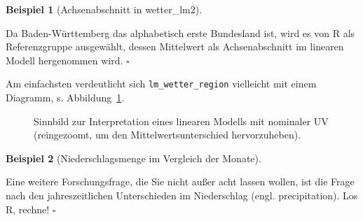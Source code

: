 \documentclass[
  letterpaper,
  twoside,
  open=any]{scrbook}
\theoremstyle{definition}
\theoremstyle{definition}
\newtheorem{example}{Beispiel}[chapter]
\theoremstyle{definition}
\theoremstyle{remark}
\begin{document}
\begin{example}[Achsenabschnitt in
wetter\_lm2]\protect\hypertarget{exm-bawü}{}\label{exm-bawü}

Da Baden-Württemberg das alphabetisch erste Bundesland ist, wird es von
R als Referenzgruppe ausgewählt, dessen Mittelwert als Achsenabschnitt
im linearen Modell hergenommen wird. \(\square\)

\end{example}

Am einfachsten verdeutlicht sich \texttt{lm\_wetter\_region} vielleicht
mit einem Diagramm, s. Abbildung~\ref{fig-bin-nom}.

\begin{figure}


\caption{\label{fig-bin-nom}Sinnbild zur Interpretation eines linearen
Modells mit nominaler UV (reingezoomt, um den Mittelwertsunterschied
hervorzuheben).}

\end{figure}%

\begin{example}[Niederschlagsmenge im Vergleich der
Monate]\protect\hypertarget{exm-months}{}\label{exm-months}

Eine weitere Forschungsfrage, die Sie nicht außer acht lassen wollen,
ist die Frage nach den jahreszeitlichen Unterschieden im Niederschlag
(engl. precipitation). Los R, rechne! \(\square\)

\end{example}
\end{document}
